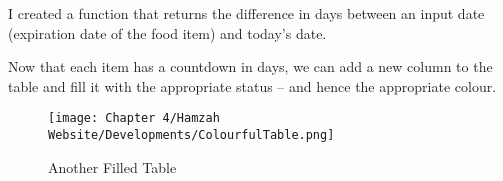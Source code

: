 I created a function that returns the difference in days between an input date (expiration date of the food item) and today's date.

Now that each item has a countdown in days, we can add a new column to the table and fill it with the appropriate status – and hence the appropriate colour.

\begin{figure}[H]        
    \centering
    \texttt{[image: Chapter 4/Hamzah Website/Developments/ColourfulTable.png]}
    \caption{Another Filled Table}
    \label{fig:devtable}
\end{figure} 